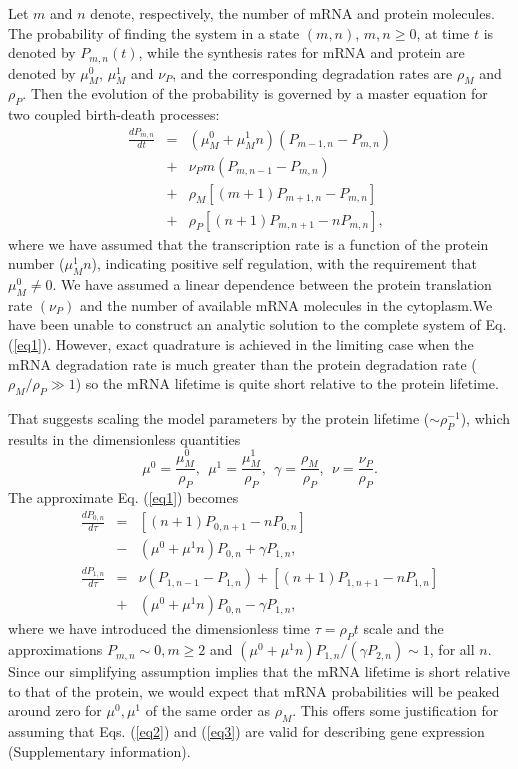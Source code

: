 Let $m$ and $n$ denote, respectively, the number of mRNA and protein
molecules.  The probability of finding the system in a state $(m,n)$,
$m,n \geq 0$, at time $t$ is denoted by $P_{m,n}(t)$, while the
synthesis rates for mRNA and protein are denoted by $\mu^0_M$,
$\mu_M^1$ and $\nu_P$, and the corresponding degradation rates are
$\rho_M$ and $\rho_P$.  Then the evolution of the probability is
governed by a master equation for two coupled birth-death processes:
\begin{eqnarray}
\frac{dP_{m,n}}{dt} &=& (\mu^0_M+\mu^1_M n)(P_{m-1,n} - P_{m,n})\nonumber \\
                   &+& \nu_P m(P_{m,n-1}-P_{m,n}) \nonumber \\
                   &+& \rho_M[(m+1)P_{m+1, n} - P_{m,n}] \nonumber \\
                   &+& \rho_P[(n+1)P_{m,n+1} - nP_{m,n}], \label{eq1}
\end{eqnarray}
where we have assumed that the transcription rate is a function of the
protein number ($\mu_M^1 n$), indicating positive self regulation,
with the requirement that $\mu^0_M \neq 0.$ We have assumed a linear
dependence between the protein translation rate $(\nu_P)$ and the
number of available mRNA molecules in the cytoplasm.We have been
unable to construct an analytic solution to the complete system of
Eq. (\ref{eq1}).  However, exact quadrature is achieved in the
limiting case when the mRNA degradation rate is much greater than the
protein degradation rate ($\rho_M / \rho_P \gg 1$)
\cite{Shahrezaei2008} so the mRNA lifetime is quite short relative to
the protein lifetime.

That suggests scaling the model parameters by the protein lifetime
($\sim \rho_P^{-1} $), which results in the dimensionless quantities
\begin{equation} \label{dimlessparm}
\mu^0=\frac{\mu^0_M}{\rho_P}, \ \ \mu^1 = \frac{\mu^1_M}{\rho_P}, \ \ 
\gamma = \frac{\rho_M}{\rho_P}, \ \ \nu = \frac{\nu_P}{\rho_P}.
\end{equation}
The approximate Eq. (\ref{eq1}) becomes
\begin{eqnarray}
\frac{dP_{0,n}}{d\tau} &=& [(n+1)P_{0,n+1} - nP_{0,n}]  \nonumber \\
                      &-& (\mu^0 + \mu^1 n) P_{0,n}
                      + \gamma P_{1,n}, \label{eq2} \\
\frac{dP_{1,n}}{d\tau} &=& \nu (P_{1,n-1} - P_{1,n})
                        +  [(n+1)P_{1,n+1} - nP_{1,n}] \nonumber \\
                       &+& (\mu^0 + \mu^1 n) P_{0,n} - \gamma P_{1,n},
                          \label{eq3}
\end{eqnarray}
where we have introduced the dimensionless time $\tau = \rho_P t$
scale and the approximations $ P_{m,n} \sim 0, m\ge2$ and $(\mu^0 +
\mu^1 n)P_{1,n}/(\gamma P_{2,n}) \sim 1$, for all $n$.  Since our
simplifying assumption implies that the mRNA lifetime is short
relative to that of the protein, we would expect that mRNA
probabilities will be peaked around zero for $\mu^0, \mu^1$ of the
same order as $\rho_M$. This offers some justification for assuming
that Eqs. (\ref{eq2}) and (\ref{eq3}) are valid for describing gene
expression (Supplementary information).


